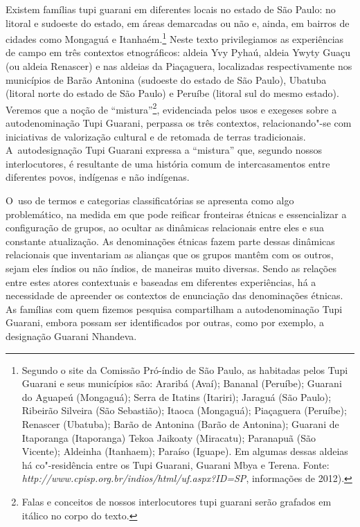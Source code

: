 \noindent
Existem famílias tupi guarani em diferentes locais no estado de São
Paulo: no litoral e sudoeste do estado, em áreas demarcadas ou não e,
ainda, em bairros de cidades como Mongaguá e Itanhaém.\footnote{Segundo
o site da Comissão Pró-índio de São Paulo, as  habitadas pelos Tupi
Guarani e seus municípios são: Araribá (Avaí); Bananal (Peruíbe);
Guarani do Aguapeú (Mongaguá); Serra de Itatins (Itariri); Jaraguá (São
Paulo); Ribeirão Silveira (São Sebastião); Itaoca (Mongaguá);
Piaçaguera (Peruíbe); Renascer (Ubatuba); Barão de Antonina (Barão de
Antonina); Guarani de Itaporanga (Itaporanga) Tekoa Jaikoaty
(Miracatu); Paranapuã (São Vicente); Aldeinha (Itanhaem); Paraíso
(Iguape). Em algumas dessas aldeias há co"-residência entre os Tupi
Guarani, Guarani Mbya e Terena. Fonte: \emph{http://www.cpisp.org.br/indios/html/uf.aspx?ID=SP}, informações de
2012).} Neste texto privilegiamos as experiências de campo em três
contextos etnográficos: aldeia Yvy Pyhaú, aldeia Ywyty Guaçu (ou aldeia
Renascer) e nas aldeias da  Piaçaguera, localizadas respectivamente
nos municípios de Barão Antonina (sudoeste do estado de São Paulo),
Ubatuba (litoral norte do estado de São Paulo) e Peruíbe (litoral sul
do mesmo estado). Veremos que a noção de ``mistura''\footnote{Falas e
conceitos de nossos interlocutores tupi guarani serão grafados em
itálico no corpo do texto.}, evidenciada pelos usos e exegeses sobre a
autodenominação Tupi Guarani, perpassa os três contextos,
relacionando"-se com iniciativas de valorização cultural e de retomada
de terras tradicionais. A~autodesignação Tupi Guarani expressa a
``mistura'' que, segundo nossos interlocutores, é resultante de uma história
comum de intercasamentos entre diferentes povos, indígenas e não
indígenas. 

O~uso de termos e categorias classificatórias se apresenta como algo
problemático, na medida em que pode reificar fronteiras étnicas e
essencializar a configuração de grupos, ao ocultar as dinâmicas
relacionais entre eles e sua constante atualização. As denominações
étnicas fazem parte dessas dinâmicas relacionais que inventariam as
alianças que os grupos mantêm com os outros, sejam eles índios ou não
índios, de maneiras muito diversas. Sendo as relações entre estes
atores contextuais e baseadas em diferentes experiências, há a
necessidade de apreender os contextos de enunciação das denominações
étnicas. As famílias com quem fizemos pesquisa compartilham a
autodenominação Tupi Guarani, embora possam ser identificados por
outras, como por exemplo, a designação Guarani Nhandeva.

